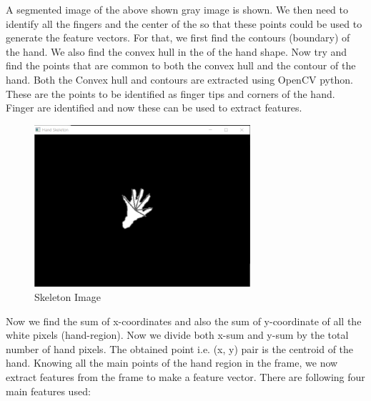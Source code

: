 A segmented image of the above shown gray image is shown.
\hfill \break
We then need to identify all the fingers and the center of the so that these points could be used to generate the feature vectors. For that, we first find the contours (boundary) of the hand. We also find the convex hull in the of the hand shape. Now try and find the points that are common to both the convex hull and the contour of the hand. Both the Convex hull and contours are extracted using OpenCV python. These are the points to be identified as finger tips and corners of the hand. Finger are identified and now these can be used to extract features.
\begin{figure}[!htb]
	\begin{center}
		\includegraphics[height=6cm,width=8cm]{ThesisFigs/skeletonImage}
		\caption{Skeleton Image}\label{fig:skeletonImage}
	\end{center}
\end{figure}
Now we find the sum of x-coordinates and also the sum of y-coordinate of all the white pixels (hand-region). Now we divide both x-sum and y-sum by the total number of hand pixels. The obtained point i.e. (x, y) pair is the centroid of the hand.
\hfill \break
Knowing all the main points of the hand region in the frame, we now extract features from the frame to make a feature vector. There are following four main features used:

